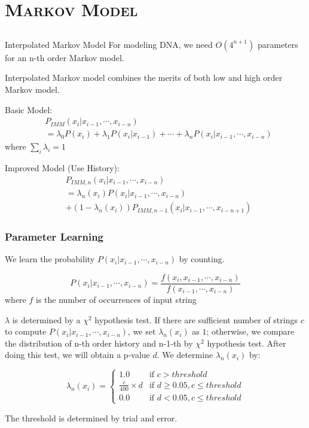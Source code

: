 \documentclass[xcolor=x11names,compress]{beamer}
\renewcommand{\(}{\begin{columns}}
\renewcommand{\)}{\end{columns}}
\newcommand{\<}[1]{\begin{column}{#1}}
\renewcommand{\>}{\end{column}}
\begin{document}
\section{\scshape Markov Model}
\subsection{}
\begin{frame}{Interpolated Markov Model}
For modeling DNA, we need $O(4^{n+1})$ parameters for an n-th order Markov model.

Interpolated Markov model combines the merits of both low and high order Markov model. 

Basic Model:
\begin{equation*}
\begin{aligned}
&P_{IMM}(x_i | x_{i-1}, \cdots, x_{i-n})\\
&= \lambda_0P(x_i)+\lambda_1P(x_i | x_{i-1})+\cdots+\lambda_nP(x_i | x_{i-1}, \cdots, x_{i-n})
\end{aligned}
\end{equation*}
where $\sum_{i}\lambda_i = 1$

Improved Model (Use History):
\begin{equation*}
\begin{aligned}
&P_{IMM, n}(x_i | x_{i-1}, \cdots, x_{i-n})\\
&= \lambda_n(x_i)P(x_i | x_{i-1}, \cdots, x_{i-n})\\
&+(1-\lambda_n(x_i))P_{IMM, n-1}(x_i | x_{i-1}, \cdots, x_{i-n+1})
\end{aligned}
\end{equation*}
\end{frame}

\begin{frame}
\frametitle{Parameter Learning}
We learn the probability $P(x_i | x_{i-1}, \cdots, x_{i-n})$ by counting. 

\begin{equation*}
P(x_i | x_{i-1}, \cdots, x_{i-n}) = \frac{f(x_i, x_{i-1}, \cdots, x_{i-n})}{f(x_{i-1}, \cdots, x_{i-n})}
\end{equation*}
where $f$ is the number of occurrences of input string

$\lambda$ is determined by a $\chi^2$ hypothesis test. If there are sufficient number of strings $c$ to compute $P(x_i | x_{i-1}, \cdots, x_{i-n})$, we set $\lambda_n(x_i)$ as $1$; otherwise, we compare the distribution of n-th order history and n-1-th by $\chi^2$ hypothesis test. After doing this test, we will obtain a p-value $d$. We determine $\lambda_n(x_i)$ by:

\begin{equation*}
\lambda_n(x_i) = 
\begin{cases}
1.0	& \text{if } c > threshold \\
\frac{c}{400} \times d & \text{if } d \ge 0.05, c \le threshold\\
0.0 & \text{if } d < 0.05, c \le threshold
\end{cases}
\end{equation*}

The threshold is determined by trial and error. 
\end{frame}
\end{document}
